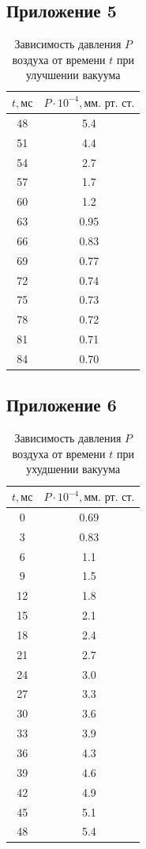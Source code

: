 \subsection{Приложение 5} \label{Приложение 5}
\begin{table}[h]
    \centering
    \begin{tabular}{|c|c|}
    \hline
    $t, \text{мс}$ & $P\cdot 10^{-4}, \text{мм. рт. ст.}$ \\ \hline
    48 & 5.4 \\ \hline
    51 & 4.4 \\ \hline
    54 & 2.7 \\ \hline
    57 & 1.7 \\ \hline
    60 & 1.2 \\ \hline
    63 & 0.95 \\ \hline 
    66 & 0.83 \\ \hline
    69 & 0.77 \\ \hline
    72 & 0.74 \\ \hline
    75 & 0.73 \\ \hline
    78 & 0.72 \\ \hline
    81 & 0.71 \\ \hline
    84 & 0.70 \\ \hline
     
\end{tabular}
    \caption{Зависимость давления $P$ воздуха от времени $t$ при улучшении вакуума}
    \label{tab:t1}
\end{table}
\newpage
\subsection{Приложение 6} \label{Приложение 6}
\begin{table}[ht]
    \centering
    \begin{tabular}{|c|c|}
    \hline
    $t, \text{мс}$ & $P\cdot 10^{-4}, \text{мм. рт. ст.}$ \\ \hline
    0  & 0.69 \\ \hline
    3  & 0.83 \\ \hline
    6  & 1.1 \\ \hline
    9  & 1.5 \\ \hline
    12 & 1.8 \\ \hline
    15 & 2.1 \\ \hline
    18 & 2.4 \\ \hline
    21 & 2.7 \\ \hline
    24 & 3.0 \\ \hline
    27 & 3.3 \\ \hline
    30 & 3.6 \\ \hline
    33 & 3.9 \\ \hline
    36 & 4.3 \\ \hline
    39 & 4.6 \\ \hline
    42 & 4.9 \\ \hline
    45 & 5.1 \\ \hline
    48 & 5.4 \\ \hline
     
\end{tabular}
    \caption{Зависимость давления $P$ воздуха от времени $t$ при ухудшении вакуума}
    \label{tab:t1}
\end{table}
